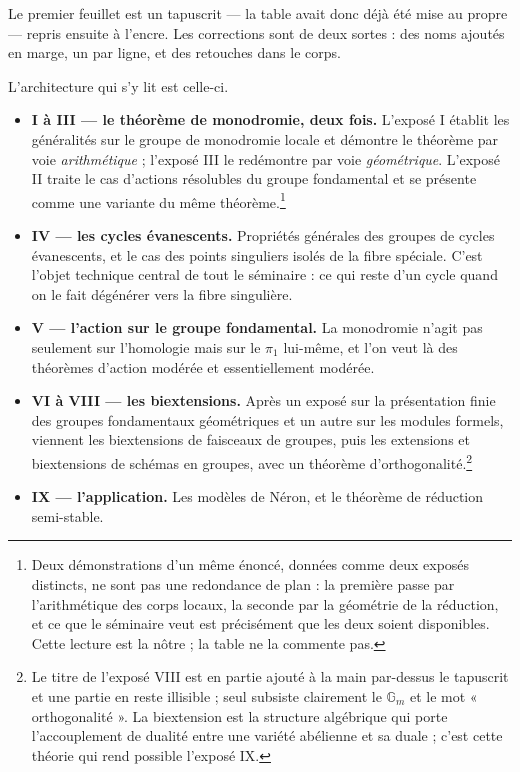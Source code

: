\documentclass[11pt,a4paper]{article}
\begin{document}
Le premier feuillet est un tapuscrit --- la table avait donc déjà été mise au
propre --- repris ensuite à l'encre. Les corrections sont de deux sortes : des
noms ajoutés en marge, un par ligne, et des retouches dans le corps.

L'architecture qui s'y lit est celle-ci.

\begin{itemize}
\item \textbf{I à III --- le théorème de monodromie, deux fois.} L'exposé I
établit les généralités sur le groupe de monodromie locale et démontre le
théorème par voie \emph{arithmétique} ; l'exposé III le redémontre par voie
\emph{géométrique}. L'exposé II traite le cas d'actions résolubles du groupe
fondamental et se présente comme une variante du même théorème.\footnote{Deux
démonstrations d'un même énoncé, données comme deux exposés distincts, ne sont
pas une redondance de plan : la première passe par l'arithmétique des corps
locaux, la seconde par la géométrie de la réduction, et ce que le séminaire
veut est précisément que les deux soient disponibles. Cette lecture est la
nôtre ; la table ne la commente pas.}

\item \textbf{IV --- les cycles évanescents.} Propriétés générales des groupes
de cycles évanescents, et le cas des points singuliers isolés de la fibre
spéciale. C'est l'objet technique central de tout le séminaire : ce qui reste
d'un cycle quand on le fait dégénérer vers la fibre singulière.

\item \textbf{V --- l'action sur le groupe fondamental.} La monodromie n'agit
pas seulement sur l'homologie mais sur le $\pi_{1}$ lui-même, et l'on veut là
des théorèmes d'action modérée et essentiellement modérée.

\item \textbf{VI à VIII --- les biextensions.} Après un exposé sur la
présentation finie des groupes fondamentaux géométriques et un autre sur les
modules formels, viennent les biextensions de faisceaux de groupes, puis les
extensions et biextensions de schémas en groupes, avec un théorème
d'orthogonalité.\footnote{Le titre de l'exposé VIII est en partie ajouté à la
main par-dessus le tapuscrit et une partie en reste illisible ; seul subsiste
clairement le $\mathbb{G}_{m}$ et le mot « orthogonalité ». La biextension est
la structure algébrique qui porte l'accouplement de dualité entre une variété
abélienne et sa duale ; c'est cette théorie qui rend possible l'exposé IX.}

\item \textbf{IX --- l'application.} Les modèles de Néron, et le théorème de
réduction semi-stable.
\end{itemize}
\end{document}
